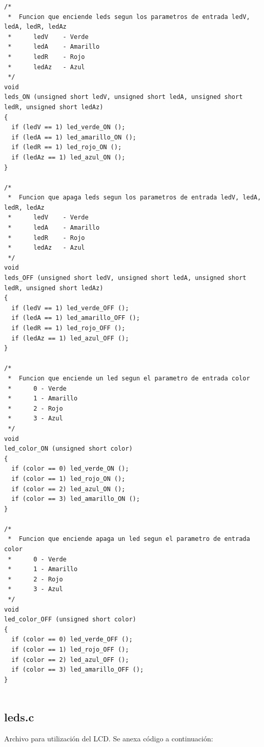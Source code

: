 \documentclass[paper=letter, fontsize=12pt]{article}
\begin{document}
\begin{lstlisting}[style=CStyle]
/*
 *	Funcion que enciende leds segun los parametros de entrada ledV, ledA, ledR, ledAz
 *		ledV 	- Verde
 *		ledA 	- Amarillo
 *		ledR 	- Rojo
 *		ledAz 	- Azul
 */
void
leds_ON (unsigned short ledV, unsigned short ledA, unsigned short ledR, unsigned short ledAz)
{
  if (ledV == 1) led_verde_ON ();
  if (ledA == 1) led_amarillo_ON ();
  if (ledR == 1) led_rojo_ON ();
  if (ledAz == 1) led_azul_ON ();
}

/*
 *	Funcion que apaga leds segun los parametros de entrada ledV, ledA, ledR, ledAz
 *		ledV 	- Verde
 *		ledA 	- Amarillo
 *		ledR 	- Rojo
 *		ledAz 	- Azul
 */
void
leds_OFF (unsigned short ledV, unsigned short ledA, unsigned short ledR, unsigned short ledAz)
{
  if (ledV == 1) led_verde_OFF ();
  if (ledA == 1) led_amarillo_OFF ();
  if (ledR == 1) led_rojo_OFF ();
  if (ledAz == 1) led_azul_OFF ();
}

/*
 *	Funcion que enciende un led segun el parametro de entrada color
 *		0 - Verde
 *		1 - Amarillo
 *		2 - Rojo
 *		3 - Azul
 */
void
led_color_ON (unsigned short color)
{
  if (color == 0) led_verde_ON ();
  if (color == 1) led_rojo_ON ();
  if (color == 2) led_azul_ON ();
  if (color == 3) led_amarillo_ON ();
}

/*
 *	Funcion que enciende apaga un led segun el parametro de entrada color
 *		0 - Verde
 *		1 - Amarillo
 *		2 - Rojo
 *		3 - Azul
 */
void
led_color_OFF (unsigned short color)
{
  if (color == 0) led_verde_OFF ();
  if (color == 1) led_rojo_OFF ();
  if (color == 2) led_azul_OFF ();
  if (color == 3) led_amarillo_OFF ();
}


\end{lstlisting}

\subsection{\textbf{leds.c}}
Archivo para utilización del LCD. Se anexa código a continuación:\\
\end{document}
